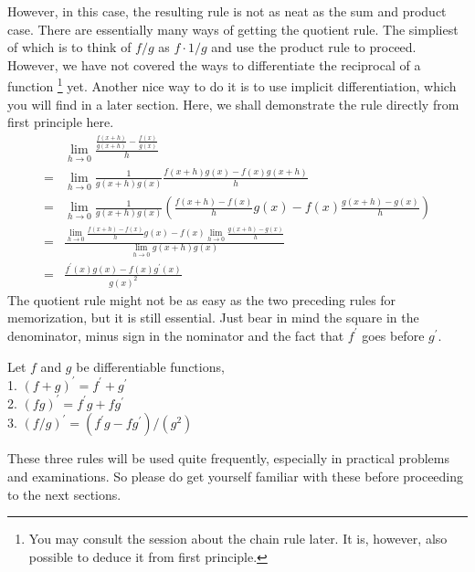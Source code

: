 However, in this case, the resulting rule is not as neat as the sum and product case.
There are essentially many ways of getting the quotient rule.
The simpliest of which is to think of $f/g$ as $f\cdot 1/g$ and use the product rule to proceed.
However, we have not covered the ways to differentiate the reciprocal of a function
\footnote{You may consult the session about the chain rule later. It is, however, also possible to deduce it from first principle.}
yet.
Another nice way to do it is to use implicit differentiation, which you will find in a later section.
Here, we shall demonstrate the rule directly from first principle here.
\begin{align*}
    &\lim_{h\to0}\frac{\frac{f(x+h)}{g(x+h)}-\frac{f(x)}{g(x)}}{h}\\
    =&\lim_{h\to0}\frac{1}{g(x+h)g(x)}\frac{f(x+h)g(x)-f(x)g(x+h)}{h}\\
    =&\lim_{h\to0}\frac{1}{g(x+h)g(x)}
    \left(\frac{f(x+h)-f(x)}{h}g(x)-f(x)\frac{g(x+h)-g(x)}{h}\right)\\
    =&\frac{\lim_{h\to0}\frac{f(x+h)-f(x)}{h}g(x)-f(x)\lim_{h\to0}\frac{g(x+h)-g(x)}{h}}{\lim_{h\to0}g(x+h)g(x)}\\
    =&\frac{f^\prime(x)g(x)-f(x)g^\prime(x)}{g(x)^2}
\end{align*}
The quotient rule might not be as easy as the two preceding rules for memorization, but it is still essential.
Just bear in mind the square in the denominator, minus sign in the nominator and the fact that $f^\prime$ goes before $g^\prime$.
\begin{theorem}
    Let $f$ and $g$ be differentiable functions,\\
    1. $(f+g)^\prime=f^\prime+g^\prime$\\
    2. $(fg)^\prime=f^\prime g+fg^\prime$\\
    3. $(f/g)^\prime=(f^\prime g-fg^\prime)/(g^2)$
\end{theorem}
These three rules will be used quite frequently, especially in practical problems and examinations. So please do get yourself familiar with these before proceeding to the next sections.
